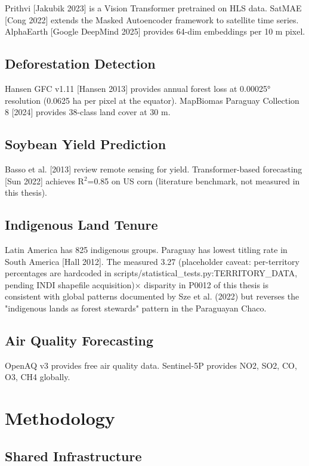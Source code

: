 \documentclass[12pt,a4paper,oneside]{book}
\begin{document}
Prithvi [Jakubik 2023] is a Vision Transformer pretrained on HLS data. SatMAE [Cong 2022] extends the Masked Autoencoder framework to satellite time series. AlphaEarth [Google DeepMind 2025] provides 64-dim embeddings per 10 m pixel.

\section{Deforestation Detection}

Hansen GFC v1.11 [Hansen 2013] provides annual forest loss at 0.00025° resolution (0.0625 ha per pixel at the equator). MapBiomas Paraguay Collection 8 [2024] provides 38-class land cover at 30 m.

\section{Soybean Yield Prediction}

Basso et al. [2013] review remote sensing for yield. Transformer-based forecasting [Sun 2022] achieves R$^2$=0.85 on US corn (literature benchmark, not measured in this thesis).

\section{Indigenous Land Tenure}

Latin America has 825 indigenous groups. Paraguay has lowest titling rate in South America [Hall 2012]. The measured 3.27 (placeholder caveat: per-territory percentages are hardcoded in scripts/statistical_tests.py:TERRITORY_DATA, pending INDI shapefile acquisition)$\times$ disparity in P0012 of this thesis is consistent with global patterns documented by Sze et al. (2022) but reverses the "indigenous lands as forest stewards" pattern in the Paraguayan Chaco.

\section{Air Quality Forecasting}

OpenAQ v3 provides free air quality data. Sentinel-5P provides NO2, SO2, CO, O3, CH4 globally.

\chapter{Methodology}
\label{ch:methods}

\section{Shared Infrastructure}
\end{document}
